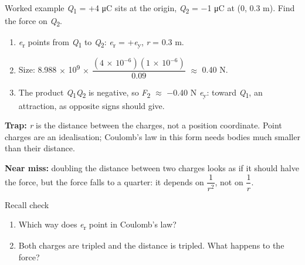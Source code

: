 \documentclass[11pt]{article}
\begin{document}
\begin{keepsection}
\begin{workedbox}{Worked example}
\textit{Q}\textsubscript{1} = +4 μC sits at the origin, \textit{Q}\textsubscript{2} = \ensuremath{-}1 μC at (0, 0.3 m). Find the force on \textit{Q}\textsubscript{2}.

\begin{enumerate}
\item \textit{e}\textsubscript{r} points from \textit{Q}\textsubscript{1} to \textit{Q}\textsubscript{2}: \textit{e}\textsubscript{r} = +\textit{e}\textsubscript{y}, \textit{r} = 0.3 m.
\item Size: 8.988 \ensuremath{\times} 10\textsuperscript{9} \ensuremath{\times} {\small\ensuremath{\dfrac{(4\, \times \, 10^{-6})(1\, \times \, 10^{-6})}{0.09}}} \ensuremath{\approx} 0.40 N.
\item The product \textit{Q}\textsubscript{1}\textit{Q}\textsubscript{2} is negative, so \textit{F}\textsubscript{2} \ensuremath{\approx} \ensuremath{-}0.40 N \textit{e}\textsubscript{y}: toward \textit{Q}\textsubscript{1}, an attraction, as opposite signs should give.
\end{enumerate}
\end{workedbox}

\begin{notebox}\textbf{Trap:} \textit{r} is the distance between the charges, not a position coordinate. Point charges are an idealisation; Coulomb’s law in this form needs bodies much smaller than their distance.\end{notebox}

\begin{notebox}\textbf{Near miss:} doubling the distance between two charges looks as if it should halve the force, but the force falls to a quarter: it depends on {\small\ensuremath{\dfrac{1}{{r}^{2}}}}, not on {\small\ensuremath{\dfrac{1}{{r}}}}.\end{notebox}

\begin{recallbox}{Recall check}
\begin{enumerate}
\item Which way does \textit{e}\textsubscript{r} point in Coulomb’s law?
\item Both charges are tripled and the distance is tripled. What happens to the force?
\end{enumerate}

\end{recallbox}
\end{keepsection}
\end{document}
